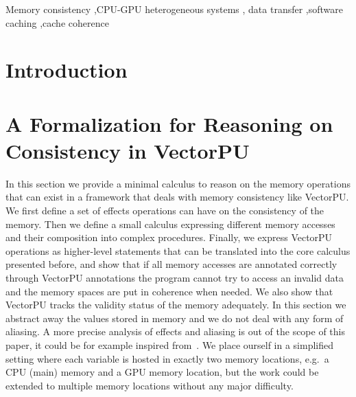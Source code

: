 \documentclass[preprint,12pt]{elsarticle}
\begin{document}
\begin{frontmatter}
\begin{abstract}
\end{abstract}

\begin{keyword}
Memory consistency \sep CPU-GPU heterogeneous systems \sep  
data transfer \sep  software caching \sep  cache coherence 


\end{keyword}

\end{frontmatter}

\section{Introduction}



\section{A Formalization for Reasoning on  Consistency in VectorPU}\label{sec:Formal}

In this section we provide a minimal calculus to reason on the memory operations that can 
exist in a framework that deals with memory consistency like VectorPU. We first define a 
set of effects operations can have on the consistency of the memory. Then we define a 
small calculus expressing different memory accesses and their composition into complex 
procedures. Finally, we express VectorPU operations as higher-level statements that can 
be translated  into the core calculus presented before, and show that if all memory 
accesses are annotated correctly through VectorPU annotations the program cannot try to 
access an invalid data and the memory spaces are put in coherence when needed. We also 
show that VectorPU tracks the validity status of the memory adequately. In this 
section we abstract away the values stored in memory and we 
do not deal with any form of aliasing. A more precise analysis of effects and aliasing is 
out of the scope of this paper, it could be for example inspired 
from~\cite{Nielson1999}.
We place ourself in a simplified setting where each variable is hosted in exactly two 
memory locations, e.g.\ a CPU (main) memory and a GPU memory location, but the work could be extended to multiple memory 
locations without any major difficulty.
\end{document}
